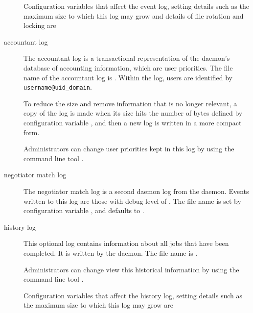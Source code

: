 \begin{description}
  Configuration variables that affect the event log, 
  setting details such as
  the maximum size to which this log may grow and details of file rotation
  and locking are
  \begin{description}
  \item [] 
  \item []
  \item []
  \item []
  \item []
  \item []
  \item []
  \end{description}

  
\item[accountant log]
  The accountant log is a transactional representation of the 
   daemon's database of accounting information,
  which are user priorities.
  The file name of the accountant log is .
  Within the log, users are identified by  \verb|username@uid_domain|. 

  To reduce the size and remove information that is no longer relevant,
  a copy of the log is made when its size hits the number of bytes
  defined by configuration variable ,
  and then a new log is written in a more compact form. 

  Administrators can change user priorities kept in this log by using
  the command line tool .

\item[negotiator match log]
  The negotiator match log is a second daemon log from the 
  daemon. 
  Events written to this log are those with debug level of .
  The file name is set by configuration variable 
  ,
  and defaults to .
  
\item[history log]
  This optional log contains information about all jobs that have been
  completed.
  It is written by the  daemon.
  The file name is .

  Administrators can change view this historical information by using
  the command line tool .

  Configuration variables that affect the history log, 
  setting details such as
  the maximum size to which this log may grow are
  \begin{description}
  \item [] 
  \item [] 
  \item [] 
  \end{description}

\end{description}

